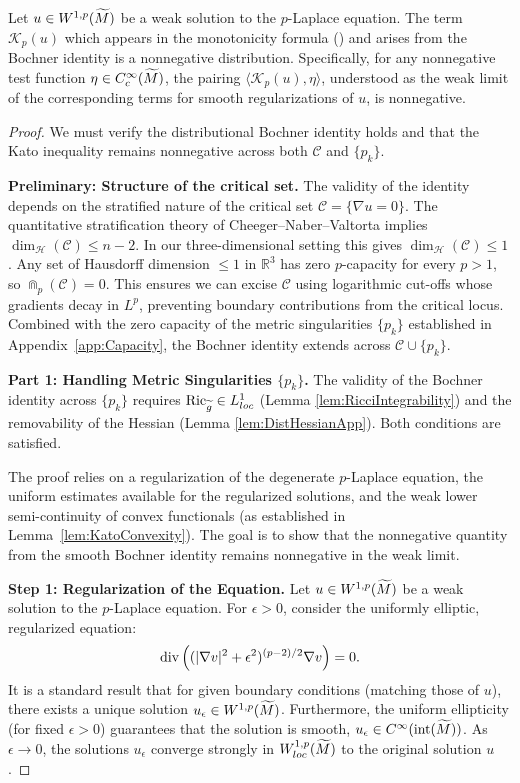 \begin{theorem}
Let $u \in W^{1,p}(\widetilde{M})$ be a weak solution to the $p$-Laplace equation. The term $\mathcal{K}_p(u)$ which appears in the monotonicity formula () and arises from the Bochner identity is a nonnegative distribution. Specifically, for any nonnegative test function $\eta \in C^\infty_c(\widetilde{M})$, the pairing $\langle \mathcal{K}_p(u), \eta \rangle$, understood as the weak limit of the corresponding terms for smooth regularizations of $u$, is nonnegative.
\end{theorem}
\begin{proof}
We must verify the distributional Bochner identity holds and that the Kato inequality remains nonnegative across both $\mathcal{C}$ and $\{p_k\}$.

\textbf{Preliminary: Structure of the critical set.}
The validity of the identity depends on the stratified nature of the critical set $\mathcal{C} = \{\nabla u = 0\}$. The quantitative stratification theory of Cheeger--Naber--Valtorta \cite{cheegernabervaltorta2015} implies $\dim_{\mathcal{H}}(\mathcal{C}) \le n-2$. In our three-dimensional setting this gives $\dim_{\mathcal{H}}(\mathcal{C}) \le 1$. Any set of Hausdorff dimension $\le 1$ in $\mathbb{R}^3$ has zero $p$-capacity for every $p>1$, so $\Cap_p(\mathcal{C}) = 0$. This ensures we can excise $\mathcal{C}$ using logarithmic cut-offs whose gradients decay in $L^p$, preventing boundary contributions from the critical locus. Combined with the zero capacity of the metric singularities $\{p_k\}$ established in Appendix~\ref{app:Capacity}, the Bochner identity extends across $\mathcal{C} \cup \{p_k\}$.

\textbf{Part 1: Handling Metric Singularities $\{p_k\}$.}
The validity of the Bochner identity across $\{p_k\}$ requires $\mathrm{Ric}_{\widetilde{g}} \in L^1_{loc}$ (Lemma \ref{lem:RicciIntegrability}) and the removability of the Hessian (Lemma \ref{lem:DistHessianApp}). Both conditions are satisfied.

The proof relies on a regularization of the degenerate $p$-Laplace equation, the uniform estimates available for the regularized solutions, and the weak lower semi-continuity of convex functionals (as established in Lemma~\ref{lem:KatoConvexity}). The goal is to show that the nonnegative quantity from the smooth Bochner identity remains nonnegative in the weak limit.

\textbf{Step 1: Regularization of the Equation.}
Let $u \in W^{1,p}(\widetilde{M})$ be a weak solution to the $p$-Laplace equation. For $\epsilon > 0$, consider the uniformly elliptic, regularized equation:
\begin{equation}
    \mathrm{div}\left( (|\nabla v|^2 + \epsilon^2)^{(p-2)/2} \nabla v \right) = 0.
\end{equation}
It is a standard result that for given boundary conditions (matching those of $u$), there exists a unique solution $u_\epsilon \in W^{1,p}(\widetilde{M})$. Furthermore, the uniform ellipticity (for fixed $\epsilon > 0$) guarantees that the solution is smooth, $u_\epsilon \in C^\infty(\text{int}(\widetilde{M}))$. As $\epsilon \to 0$, the solutions $u_\epsilon$ converge strongly in $W^{1,p}_{loc}(\widetilde{M})$ to the original solution $u$.


\end{proof}
